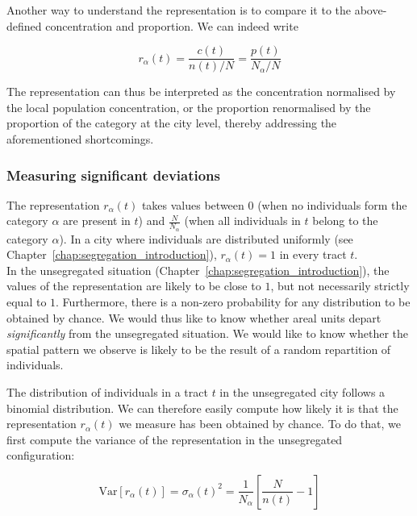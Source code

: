 Another way to understand the representation is to compare it to the
above-defined concentration and proportion. We can indeed write

\begin{equation}
    r_\alpha(t) = \frac{c(t)}{n(t) / N} = \frac{p(t)}{N_\alpha/N}
\end{equation}

The representation can thus be interpreted as the concentration
normalised by the local population concentration, or the proportion renormalised
by the proportion of the category at the city level, thereby addressing the
aforementioned shortcomings.\\


\subsubsection{Measuring significant deviations}
\label{ssub:measuring_significant_deviations}


The representation $r_\alpha(t)$ takes values between $0$ (when no
individuals form the category $\alpha$ are present in $t$) and
$\frac{N}{N_\alpha}$ (when all individuals in $t$ belong to the category
$\alpha$). In a city where individuals are distributed uniformly
(see Chapter~\ref{chap:segregation_introduction}), $r_\alpha(t) = 1$ in every
tract $t$.\\


In the unsegregated situation (Chapter~\ref{chap:segregation_introduction}), the
values of the representation are likely to be close to $1$, but not necessarily
strictly equal to $1$. Furthermore, there is a non-zero probability for any
distribution to be obtained by chance. We would thus like to know whether areal
units depart \emph{significantly} from the unsegregated situation. We would like
to know whether the spatial pattern we observe is likely to be the result of a
random repartition of individuals.

The distribution of individuals in a tract $t$ in the unsegregated
city follows a binomial distribution. We can therefore easily compute how likely it is that
the representation $r_\alpha(t)$ we measure has been obtained by chance. To do
that, we first compute the variance of the representation in the unsegregated
configuration:

\begin{equation}
    \mathrm{Var}\left[r_\alpha(t)\right] = \sigma_\alpha(t)^2 = \frac{1}{N_\alpha} \left[\frac{N}{n(t)} - 1\right]
\end{equation}

